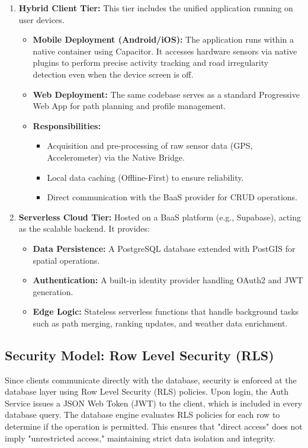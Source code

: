 \begin{enumerate}
    \item \textbf{Hybrid Client Tier:} This tier includes the unified application running on user devices.
    \begin{itemize}
        \item \textbf{Mobile Deployment (Android/iOS):} The application runs within a native container using Capacitor. It accesses hardware sensors via native plugins to perform precise activity tracking and road irregularity detection even when the device screen is off.
        \item \textbf{Web Deployment:} The same codebase serves as a standard Progressive Web App for path planning and profile management.
        \item \textbf{Responsibilities:}
        \begin{itemize}
            \item Acquisition and pre-processing of raw sensor data (GPS, Accelerometer) via the Native Bridge.
            \item Local data caching (Offline-First) to ensure reliability.
            \item Direct communication with the BaaS provider for CRUD operations.
        \end{itemize}
    \end{itemize}

    \item \textbf{Serverless Cloud Tier:} Hosted on a BaaS platform (e.g., Supabase), acting as the scalable backend. It provides:
    \begin{itemize}
        \item \textbf{Data Persistence:} A PostgreSQL database extended with PostGIS for spatial operations.
        \item \textbf{Authentication:} A built-in identity provider handling OAuth2 and JWT generation.
        \item \textbf{Edge Logic:} Stateless serverless functions that handle background tasks such as path merging, ranking updates, and weather data enrichment.
    \end{itemize}
\end{enumerate}

\subsection{Security Model: Row Level Security (RLS)}
Since clients communicate directly with the database, security is enforced at the database layer using Row Level Security (RLS) policies.
Upon login, the Auth Service issues a JSON Web Token (JWT) to the client, which is included in every database query. The database engine evaluates RLS policies for each row to determine if the operation is permitted. This ensures that "direct access" does not imply "unrestricted access," maintaining strict data isolation and integrity.

